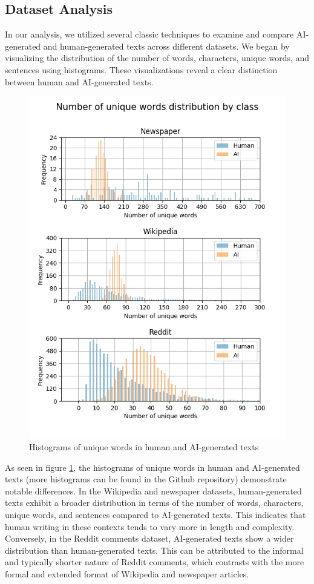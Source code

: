 \documentclass[11pt]{article}
\begin{document}
\subsection{Dataset Analysis}
In our analysis, we utilized several classic techniques to examine and compare AI-generated and human-generated texts across different datasets. We began by visualizing the distribution of the number of words, characters, unique words, and sentences using histograms. These visualizations reveal a clear distinction between human and AI-generated texts.\\
\begin{figure}[H]
  \centering
  \includegraphics[width=\linewidth]{All_datasets_unique_words.png}
  \caption{Histograms of unique words in human and AI-generated texts}
  \label{fig:unique_words}
\end{figure}

As seen in figure \ref{fig:unique_words}, the histograms of unique words in human and AI-generated texts (more histograms can be found in the Github repository) demonstrate notable differences.
In the Wikipedia and newspaper datasets, human-generated texts exhibit a broader distribution in terms of the number of words, characters, unique words, and sentences compared to AI-generated texts. This indicates that human writing in these contexts tends to vary more in length and complexity. Conversely, in the Reddit comments dataset, AI-generated texts show a wider distribution than human-generated texts. This can be attributed to the informal and typically shorter nature of Reddit comments, which contrasts with the more formal and extended format of Wikipedia and newspaper articles.
\end{document}
